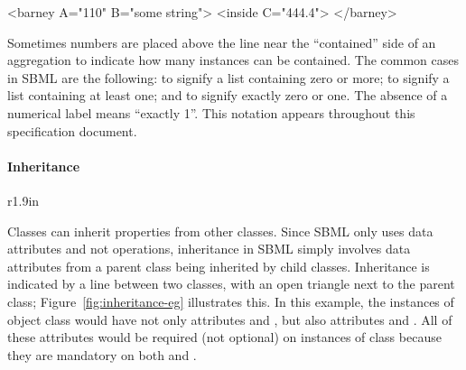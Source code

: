\begin{blockChanged}
\begin{example}
<barney A="110" B="some string">
    <inside C="444.4">
</barney>
\end{example}

Sometimes numbers are placed above the line near the ``contained''
side of an aggregation to indicate how many instances can be
contained.  The common cases in SBML are the following:
\token{[0..*]} to signify a list containing zero or more;
\token{[1..*]} to signify a list containing at least one; and
\token{[0..1]} to signify exactly zero or one.  The absence of a
numerical label means ``exactly 1''.  This notation appears
throughout this specification document.


\paragraph{Inheritance}

\begin{wrapfigure}[18]{r}{1.9in}
  \centering
  \small
  \vspace*{-7ex}
  \caption{Inheritance.}
  \label{fig:inheritance-eg}
\end{wrapfigure}
Classes can inherit properties from other classes.  Since SBML
only uses data attributes and not operations, inheritance in SBML
simply involves data attributes from a parent class being
inherited by child classes.  Inheritance is indicated by a line
between two classes, with an open triangle next to the parent
class; Figure~\ref{fig:inheritance-eg} illustrates this.  In this
example, the instances of object class  would have
not only attributes  and , but also attributes
 and .  All of these attributes would be
required (not optional) on instances of class 
because they are mandatory on both  and
.




\end{blockChanged}
